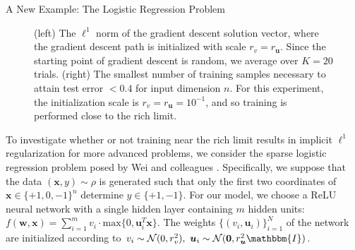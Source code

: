 \documentclass[final, 20pt]{beamer}
\newlength{\colwidth}
\begin{document}
\begin{frame}[t]
\begin{columns}[t]
\begin{column}{\colwidth}
\begin{block}{A New Example: The Logistic Regression Problem}
    \begin{figure}
        \centering
        \hfill
        \hfill
        \caption{(left) The $\ell^1$ norm of the gradient descent solution vector, where the gradient descent path is initialized with scale $r_v = r_{\boldsymbol{u}}$. Since the starting point of gradient descent is random, we average over $K=20$ trials. (right) The smallest number of training samples necessary to attain test error $< 0.4$ for input dimension $n$. For this experiment, the initialization scale is $r_v = r_{\boldsymbol{u}} = 10^{-1}$, and so training is performed close to the rich limit.}
        \label{fig:my_label}
    \end{figure}
    
    To investigate whether or not training near the rich limit results in implicit $\ell^1$ regularization for more advanced problems, we consider the sparse logistic regression problem posed by Wei and colleagues \cite{wei2019regularization}. Specifically, we suppose that the data  $(\boldsymbol{x}, y) \sim \rho$ is generated such that only the first two coordinates of $\boldsymbol{x} \in \{+1, 0, -1\}^n$ determine $y \in \{+1, -1\}$. For our model, we choose a ReLU neural network with a single hidden layer containing $m$ hidden units: $f(\boldsymbol{w}, \boldsymbol{x}) = \sum_{i=1}^m v_i \cdot \text{max}\{0, \boldsymbol{u}_i^T\boldsymbol{x}\}$.
    The weights $\{(v_i, \boldsymbol{u}_i)\}_{i=1}^N$ of the network are initialized according to $v_i \sim \mathcal{N}(0, r_v^2), \ \boldsymbol{u}_i \sim \mathcal{N}(\boldsymbol{0}, r_{\boldsymbol{u}}^2 \mathbbm{I})$.
    

\end{block}
\end{column}
\end{columns}
\end{frame}
\end{document}
